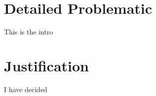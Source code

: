 \section{Detailed Problematic}\label{sec:detailed-problematic}
This is the intro
\section{Justification}\label{sec:justification}
I have decided